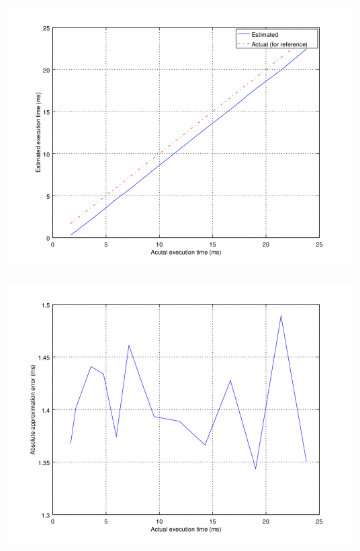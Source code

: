 \begin{figure}[ht!]
	\center
	\begin{subfigure}{0.6\linewidth}
	\center
	\includegraphics[width=\linewidth]{fig/midtaest.png}
	\end{subfigure}
	\begin{subfigure}{0.45\linewidth}
	\center
	\includegraphics[width=\linewidth]{fig/midabstaerr.png}
	\end{subfigure}
	\begin{subfigure}{0.45\linewidth}
	\center

\end{subfigure}
\end{figure}
